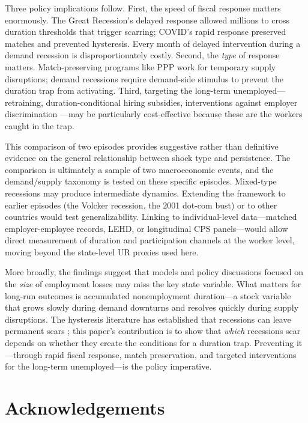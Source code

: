 \documentclass[12pt]{article}
\begin{document}
Three policy implications follow. First, the speed of fiscal response matters enormously. The Great Recession's delayed response allowed millions to cross duration thresholds that trigger scarring; COVID's rapid response preserved matches and prevented hysteresis. Every month of delayed intervention during a demand recession is disproportionately costly. Second, the \textit{type} of response matters. Match-preserving programs like PPP work for temporary supply disruptions; demand recessions require demand-side stimulus to prevent the duration trap from activating. Third, targeting the long-term unemployed---retraining, duration-conditional hiring subsidies, interventions against employer discrimination \citep{kroft2016long}---may be particularly cost-effective because these are the workers caught in the trap.

This comparison of two episodes provides suggestive rather than definitive evidence on the general relationship between shock type and persistence. The comparison is ultimately a sample of two macroeconomic events, and the demand/supply taxonomy is tested on these specific episodes. Mixed-type recessions \citep{guerrieri2022macroeconomic} may produce intermediate dynamics. Extending the framework to earlier episodes (the Volcker recession, the 2001 dot-com bust) or to other countries would test generalizability. Linking to individual-level data---matched employer-employee records, LEHD, or longitudinal CPS panels---would allow direct measurement of duration and participation channels at the worker level, moving beyond the state-level UR proxies used here.

More broadly, the findings suggest that models and policy discussions focused on the \textit{size} of employment losses may miss the key state variable. What matters for long-run outcomes is accumulated nonemployment duration---a stock variable that grows slowly during demand downturns and resolves quickly during supply disruptions. The hysteresis literature has established that recessions can leave permanent scars \citep{cerra2023hysteresis}; this paper's contribution is to show that \textit{which} recessions scar depends on whether they create the conditions for a duration trap. Preventing it---through rapid fiscal response, match preservation, and targeted interventions for the long-term unemployed---is the policy imperative.


\section*{Acknowledgements}
\end{document}
